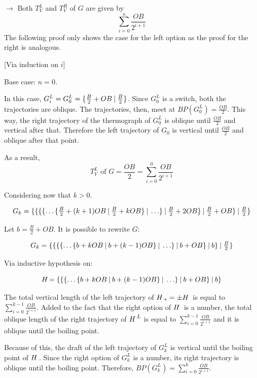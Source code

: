 \begin{list}{}{}
	\item[$\rightarrow$] Both $T^L_V$ and $T^R_V$ of $G$ are given by 
	$$\sum_{i=0}^n\frac{OB}{2^{i+1}}$$
	The following proof only shows the case for the left option as the proof for the right is analogous.
	
	[Via induction on $i$]
	
	Base case: $n = 0$.
	
	In this case, $G_i^L = G_0^L = \mbox{$\{\frac{B}{2} + OB\:|\:\frac{B}{2}\}$}$. Since $G_0^L$ is a switch, both the trajectories are oblique. The trajectories, then, meet at $BP(G_0^L) = \frac{OB}{2}$. This way, the right trajectory of the thermograph of $G_0^L$ is oblique until $\frac{OB}{2}$ and vertical after that. Therefore the left trajectory of $G_0$ is vertical until $\frac{OB}{2}$ and oblique after that point.
	
	As a result, 
	$$T^L_V \text{ of } G = \frac{OB}{2} = \sum_{i=0}^0\frac{OB}{2^{i+1}}$$
	
	Considering now that $k > 0$.
	
	$$
	\mbox{$G_k=\mbox{$\{
			\mbox{$\{
				\mbox{$\{
					\mbox{$\{\ldots
						\mbox{$\{\frac{B}{2} + (k+1)OB\:|\:\frac{B}{2} + kOB\}$}
						\:|\:\ldots\}$}
					\:|\:\frac{B}{2} + 2OB\}$}
				\:|\:\frac{B}{2}+OB\}$}
			\:|\:\frac{B}{2}\}$}
		$}
	$$
	
	Let $b = \frac{B}{2}+OB$. It is possible to rewrite $G$:
	
	$$
	\mbox{$G_k=\mbox{$\{
			\mbox{$\{
				\mbox{$\{
					\mbox{$\{\ldots
						\mbox{$\{b + kOB\:|\:b + (k-1)OB\}$}
					\:|\:\ldots\}$}
				\:|\:b+OB\}$}
			\:|\:b\}$}
		\:|\:\frac{B}{2}\}$}
	$}
	$$
	
	Via inductive hypothesis on:
	
	$$
	\mbox{$H\,$}{=
			\mbox{$\{
				\mbox{$\{
					\mbox{$\{\ldots
						\mbox{$\{b + kOB\:|\:b + (k-1)OB\}$}
					\:|\:\ldots\}$}
				\:|\:b + OB\}$}
			\:|\:b\}$}
	}
	$$
	
	The total vertical length of the left trajectory of $\mbox{$H\,$}_* = \pm \mbox{$H\,$}$ is equal to $\sum\limits_{i=0}^{k-1}\frac{OB}{2^{i+1}}$. Added to  the fact that the right option of $\mbox{$H\,$}$ is a number, the total oblique length of the right trajectory of $\mbox{$H\,$}^L$ is equal to $\sum\limits_{i=0}^{k-1}\frac{OB}{2^{i+1}}$ and it is oblique until the boiling point. 
	
	Because of this, the draft of the left trajectory of $G_k^L$ is vertical until the boiling point of $\mbox{$H\,$}$. Since the right option of $G_k^L$ is a number, its right trajectory is oblique until the boiling point. Therefore, $BP(G_k^L) = \sum\limits_{i=0}^{k}\frac{OB}{2^{i+1}}$.
	

\end{list}
